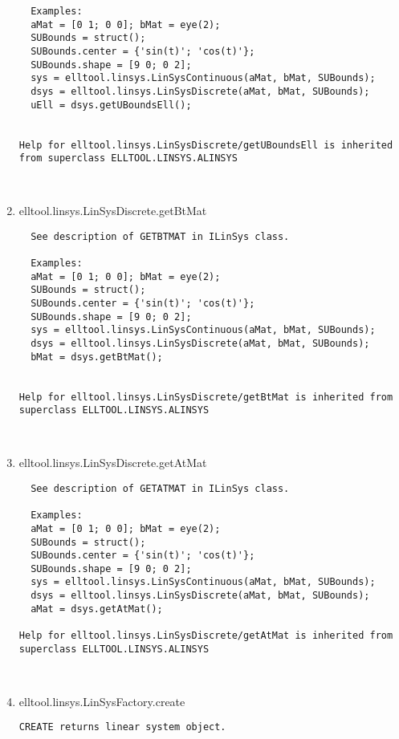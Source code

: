\begin{enumerate}
\begin{lstlisting}
  Examples:
  aMat = [0 1; 0 0]; bMat = eye(2);
  SUBounds = struct();
  SUBounds.center = {'sin(t)'; 'cos(t)'};
  SUBounds.shape = [9 0; 0 2];
  sys = elltool.linsys.LinSysContinuous(aMat, bMat, SUBounds);
  dsys = elltool.linsys.LinSysDiscrete(aMat, bMat, SUBounds);
  uEll = dsys.getUBoundsEll();


Help for elltool.linsys.LinSysDiscrete/getUBoundsEll is inherited from superclass ELLTOOL.LINSYS.ALINSYS



\end{lstlisting}
\fontfamily{\familydefault}
\selectfont
\item {elltool.linsys.LinSysDiscrete.getBtMat}
\selectfont
\begin{lstlisting}
  See description of GETBTMAT in ILinSys class.

  Examples:
  aMat = [0 1; 0 0]; bMat = eye(2);
  SUBounds = struct();
  SUBounds.center = {'sin(t)'; 'cos(t)'};
  SUBounds.shape = [9 0; 0 2];
  sys = elltool.linsys.LinSysContinuous(aMat, bMat, SUBounds);
  dsys = elltool.linsys.LinSysDiscrete(aMat, bMat, SUBounds);
  bMat = dsys.getBtMat();


Help for elltool.linsys.LinSysDiscrete/getBtMat is inherited from superclass ELLTOOL.LINSYS.ALINSYS



\end{lstlisting}
\fontfamily{\familydefault}
\selectfont
\item {elltool.linsys.LinSysDiscrete.getAtMat}
\selectfont
\begin{lstlisting}
  See description of GETATMAT in ILinSys class.

  Examples:
  aMat = [0 1; 0 0]; bMat = eye(2);
  SUBounds = struct();
  SUBounds.center = {'sin(t)'; 'cos(t)'};
  SUBounds.shape = [9 0; 0 2];
  sys = elltool.linsys.LinSysContinuous(aMat, bMat, SUBounds);
  dsys = elltool.linsys.LinSysDiscrete(aMat, bMat, SUBounds);
  aMat = dsys.getAtMat();

Help for elltool.linsys.LinSysDiscrete/getAtMat is inherited from superclass ELLTOOL.LINSYS.ALINSYS



\end{lstlisting}
\fontfamily{\familydefault}
\selectfont
\item {elltool.linsys.LinSysFactory.create}
\selectfont
\begin{lstlisting}
CREATE returns linear system object.


\end{lstlisting}
\end{enumerate}
